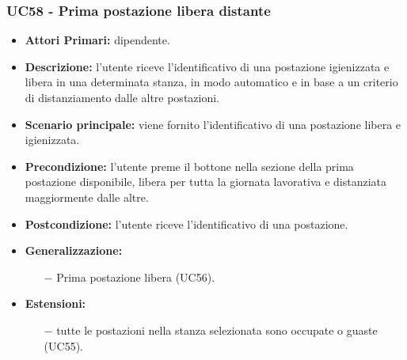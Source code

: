\subsubsection{ UC58 - Prima postazione libera distante}
\begin{itemize}
	\item\textbf{Attori Primari:} dipendente.
	\item\textbf{Descrizione:} l’utente riceve l'identificativo di una postazione igienizzata e libera in una determinata stanza, 
	in modo automatico e in base a un criterio di distanziamento dalle altre postazioni.
	\item\textbf{Scenario principale:} viene fornito l'identificativo di una postazione libera e igienizzata.
	\item\textbf{Precondizione:} l’utente preme il bottone nella sezione della prima postazione disponibile, libera per tutta la giornata lavorativa e distanziata maggiormente dalle altre.
	\item\textbf{Postcondizione:} l’utente riceve l'identificativo di una postazione.
	\item\textbf{Generalizzazione:}
	\begin{itemize}
		\item[$-$] Prima postazione libera (UC56).
	\end{itemize}
	\item\textbf{Estensioni:}
	\begin{itemize}
		\item[$-$] tutte le postazioni nella stanza selezionata sono occupate o guaste (UC55).
	\end{itemize}
\end{itemize}
